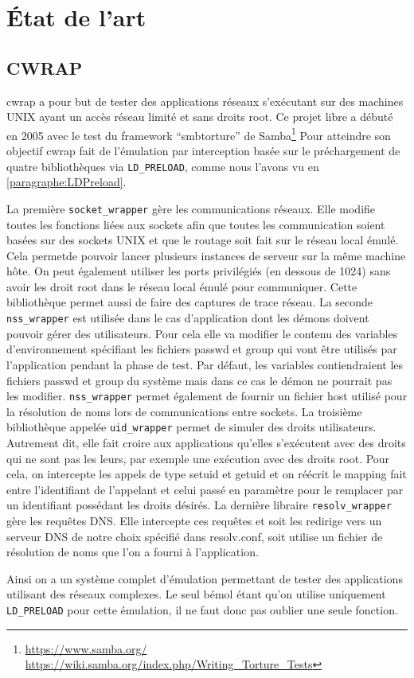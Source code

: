 \section{État de l'art}
\label{section:sota}
\subsection{CWRAP}

cwrap\citep{cwrap, cwrap_bis} a pour but de tester des applications réseaux s'exécutant sur des machines UNIX ayant un accès réseau limité et sans droits root. Ce projet libre a débuté en 2005 avec le test du framework ``smbtorture'' de Samba\footnote{\url{https://www.samba.org/} \\ \url{https://wiki.samba.org/index.php/Writing\_Torture\_Tests}} Pour atteindre son objectif cwrap fait de l'émulation par interception basée sur le préchargement de quatre bibliothèques via \texttt{LD\_PRELOAD}, comme nous l'avons vu en \ref{paragraphe:LDPreload}.

La première \texttt{socket\_wrapper} gère les communications réseaux. Elle modifie toutes les fonctions liées aux sockets afin que toutes les communication soient basées sur des sockets UNIX et que le routage soit fait sur le réseau local émulé. Cela permetde pouvoir lancer plusieurs instances de serveur sur la même machine hôte. On peut également utiliser les ports privilégiés (en dessous de 1024) sans avoir les droit root dans le réseau local émulé pour communiquer. Cette bibliothèque permet aussi de faire des captures de trace réseau. La seconde \texttt{nss\_wrapper} est utilisée dans le cas d'application dont les démons doivent pouvoir gérer des utilisateurs. Pour cela elle va modifier le contenu des variables d'environnement spécifiant les fichiers passwd et group qui vont être utilisés par l'application pendant la phase de test. Par défaut, les variables contiendraient les fichiers passwd et group du système mais dans ce cas le démon ne pourrait pas les modifier. \texttt{nss\_wrapper} permet également de fournir un fichier host utilisé pour la résolution de noms lors de communications entre sockets. La troisième bibliothèque appelée \texttt{uid\_wrapper} permet de simuler des droits utilisateurs. Autrement dit, elle fait croire aux applications qu'elles s'exécutent avec des droits qui ne sont pas les leurs, par exemple une exécution avec des droits root. Pour cela, on intercepte les appels de type setuid et getuid et on réécrit le mapping fait entre l'identifiant de l'appelant et celui passé en paramètre pour le remplacer par un identifiant possédant les droits désirés. La dernière libraire \texttt{resolv\_wrapper} gère les requêtes DNS. Elle intercepte ces requêtes et soit les redirige vers un serveur DNS de notre choix spécifié dans resolv.conf, soit utilise un fichier de résolution de noms que l'on a fourni à l'application.

Ainsi on a un système complet d'émulation permettant de tester des applications utilisant des réseaux complexes. Le seul bémol étant qu'on utilise uniquement \texttt{LD\_PRELOAD} pour cette émulation, il ne faut donc pas oublier une seule fonction.





